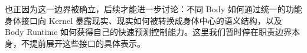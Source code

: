 \begin{statementbox}
\centering
{}
\end{statementbox}

也正因为这一边界被确立，后续才能进一步讨论：不同 Body 如何通过统一的功能身体接口向 Kernel 暴露现实、现实如何被转换成身体中心的语义结构，以及 Body Runtime 如何获得自己的快速预测控制能力。这里我们暂时停在职责边界本身，不提前展开这些接口的具体表示。

